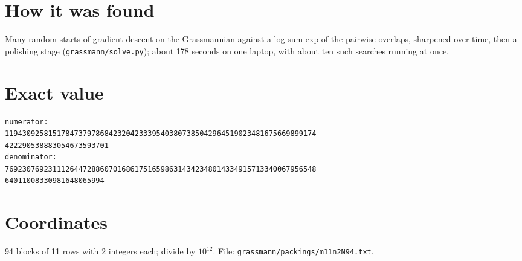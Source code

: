 \documentclass[11pt,a4paper]{article}
\begin{document}
\section{How it was found}
Many random starts of gradient descent on the Grassmannian against a log-sum-exp of the pairwise overlaps, sharpened over time, then a polishing stage (\texttt{grassmann/solve.py}); about 178 seconds on one laptop, with about ten such searches running at once.


\appendix
\section{Exact value}
{\small
\begin{verbatim}
numerator:
119430925815178473797868423204233395403807385042964519023481675669899174
422290538883054673593701
denominator:
769230769231112644728860701686175165986314342348014334915713340067956548
64011008330981648065994
\end{verbatim}}

\section{Coordinates}
94 blocks of 11 rows with 2 integers each; divide by $10^{12}$. File: \texttt{grassmann/packings/m11n2N94.txt}.
{\tiny
\begin{multicols}{4}
\end{multicols}}
\end{document}
